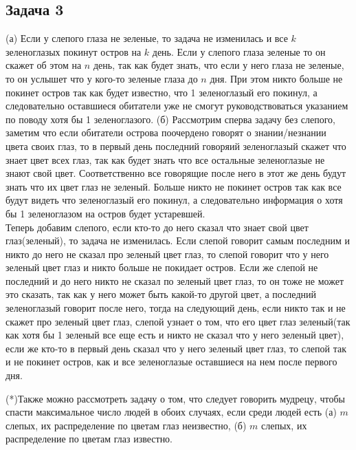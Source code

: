 \subsection*{Задача 3}
	(а) Если у слепого глаза не зеленые, то задача не изменилась и все $k$ зеленоглазых покинут остров на $k$ день. Если у слепого глаза зеленые то он скажет об этом на $n$ день, так как будет знать, что если у него глаза не зеленые, то он услышет что у кого-то зеленые глаза до $n$ дня. При этом никто больше не покинет остров так как будет известно, что 1 зеленоглазый его покинул, а следовательно оставшиеся обитатели уже не смогут руководствоваться указанием по поводу хотя бы 1 зеленоглазого. 
	\vskip 0.1in
	(б) Рассмотрим сперва задачу без слепого, заметим что если обитатели острова поочердено говорят о знании/незнании цвета своих глаз, то в первый день последний говоряий зеленоглазый скажет что знает цвет всех глаз, так как будет знать что все остальные зеленоглазые не знают свой цвет. Соответственно все говорящие после него в этот же день будут знать что их цвет глаз не зеленый. Больше никто не покинет остров так как все будут видеть что зеленоглазый его покинул, а следовательно информация о хотя бы 1 зеленоглазом на остров будет устаревшей.\\
	Теперь добавим слепого, если кто-то до него сказал что знает свой цвет глаз(зеленый), то задача не изменилась. Если слепой говорит самым последним и никто до него не сказал про зеленый цвет глаз, то слепой говорит что у него зеленый цвет глаз и никто больше не покидает остров. Если же слепой не последний и до него никто не сказал по зеленый цвет глаз, то он тоже не может это сказать, так как у него может быть какой-то другой цвет, а последний зеленоглазый говорит после него, тогда на следующий день, если никто так и не скажет про зеленый цвет глаз, слепой узнает о том, что его цвет глаз зеленый(так как хотя бы 1 зеленый все еще есть и никто не сказал что у него зеленый цвет), если же кто-то в первый день сказал что у него зеленый цвет глаз, то слепой так и не покинет остров, как и все зеленоглазые оставшиеся на нем после первого дня.
	\vskip 0.4in


	(*)Также можно рассмотреть задачу о том, что следует говорить мудрецу, чтобы спасти максимальное число людей в обоих случаях, если среди людей есть (а) $m$ слепых, их распределение по цветам глаз неизвестно, (б) $m$ слепых, их распределение по цветам глаз известно.